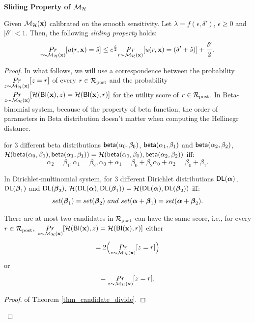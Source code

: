 \documentclass{article}
\begin{document}
\noindent \textbf{Sliding Property of $\mathcal{M}_{\mathcal{H}}$}
\begin{lem}
\label{lem_sliding}
Given $\mathcal{M}_{\mathcal{H}}(\textbf{x})$ calibrated on the smooth sensitivity. Let $\lambda = f(\epsilon,
\delta')$, $\epsilon\geq 0$ and $|\delta'| < 1$. Then, the following \emph{sliding property} holds:
\begin{equation*}
\underset{r \thicksim \mathcal{M}_{\mathcal{H}}(\textbf{x})}{Pr}[u(r,\textbf{x}) = \hat{s}]
\leq
e^{\frac{\epsilon}{2}} \underset{r \thicksim \mathcal{M}_{\mathcal{H}}(\textbf{x})}{Pr}[u(r,\textbf{x}) = (\delta' + \hat{s})] + \frac{\delta'}{2},
\end{equation*}

\end{lem}

\begin{proof}

In what follows, we will use a correspondence between the probability
 $\underset{z \thicksim \mathcal{M}_{\mathcal{H}}(\textbf{x})}{Pr}[z = r]$ of every
 $r\in\mathcal{R}_{\textup{post}}$ and the probability 
 $\underset{z \thicksim \mathcal{M}_{\mathcal{H}}(\textbf{x})}{Pr}[\mathcal{H}(\mathsf{BI}(\textbf{x}),z) =
 \mathcal{H}(\mathsf{BI}(\textbf{x}),r)]$ for the utility score of $r \in \mathcal{R}_{\textup{post}}$. In Beta-binomial system, because of the property of beta function, the order of parameters in Beta distribution doesn't matter when computing the Hellinegr distance. 

 \begin{thm}
 \label{thm_hellinegr_equality_beta}
 for 3 different beta distributions $\mathsf{beta}(\alpha_0, \beta_0)$, $\mathsf{beta}(\alpha_1, \beta_1)$ and $\mathsf{beta}(\alpha_2, \beta_2)$, $\mathcal{H}(\mathsf{beta}(\alpha_0, \beta_0),\mathsf{beta}(\alpha_1, \beta_1)) = \mathcal{H}(\mathsf{beta}(\alpha_0, \beta_0),\mathsf{beta}(\alpha_2, \beta_2))$ iff:
  $$
  \alpha_2 = \beta_1, \alpha_1 = \beta_2, \alpha_0 + \alpha_1 = \beta_0 + \beta_2 \alpha_0 + \alpha_2 = \beta_0 + \beta_1.
  $$
 \end{thm}

\begin{thm}
 \label{thm_hellinegr_equality_dirichlet}
 In Dirichlet-multinomial system, for 3 different Dirichlet distributions $\mathsf{DL}(\boldsymbol{\alpha})$, $\mathsf{DL}(\boldsymbol{\beta}_1)$ and $\mathsf{DL}(\boldsymbol{\beta}_2)$, $\mathcal{H}(\mathsf{DL}(\boldsymbol{\alpha}),\mathsf{DL}(\boldsymbol{\beta}_1)) = \mathcal{H}(\mathsf{DL}(\boldsymbol{\alpha}),\mathsf{DL}(\boldsymbol{\beta}_2))$ iff:
  $$
  set(\vbeta_1) = set(\vbeta_2)\ and\ set(\valpha + \vbeta_1) = set(\valpha + \vbeta_2).
  $$
 \end{thm}


 \begin{thm}
 \label{thm_candidate_divide}
 There are at most two candidates in $\mathcal{R}_{\textup{post}}$ can have the same score, i.e., for every $r \in \mathcal{R}_{\textup{post}}$, $\underset{z \thicksim \mathcal{M}_{\mathcal{H}}(\textbf{x})}{Pr}[\mathcal{H}(\mathsf{BI}(\textbf{x}),z) = \mathcal{H}(\mathsf{BI}(\textbf{x}),r)]$ either 
 $$
 = 2\Big ( \underset{z \thicksim \mathcal{M}_{\mathcal{H}}(\textbf{x})}{Pr}[z = r]\Big )
 $$ or 
 $$
 =\underset{z \thicksim \mathcal{M}_{\mathcal{H}}(\textbf{x})}{Pr}[z = r].
 $$
 \end{thm}
 \begin{proof} of Theorem \ref{thm_candidate_divide}.


\end{proof}
\end{proof}
\end{document}
